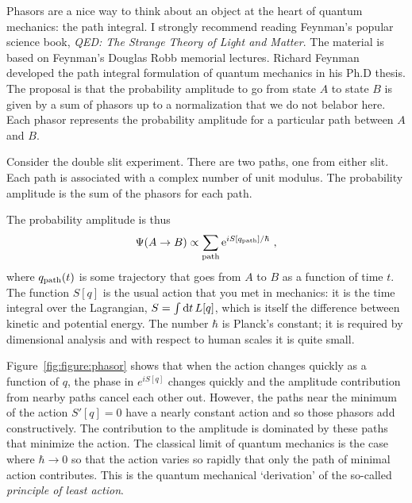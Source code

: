 \documentclass[12pt, oneside]{report}    %
\begin{document}
Phasors are a nice way to think about an object at the heart of quantum mechanics: the path integral. I strongly recommend reading Feynman's popular science book, \emph{QED: The Strange Theory of Light and Matter}\autocite{Feynman:1986er}. The material is based on Feynman's Douglas Robb memorial lectures.
% 
Richard Feynman developed the path integral formulation of quantum mechanics in his Ph.D thesis\autocite{Feynman:1942us}. The proposal is that the probability amplitude to go from state $A$ to state $B$ is given by a sum of phasors up to a normalization that we do not belabor here. Each phasor represents the probability amplitude for a particular path between $A$ and $B$. 
\begin{example}
Consider the double slit experiment. There are two paths, one from either slit. Each path is associated with a complex number of unit modulus. The probability amplitude is the sum of the phasors for each path. 
\end{example}
The probability amplitude is thus
\begin{align}
    \Psi(A\to B) \propto \sum_\textnormal{path}
    \operatorname{e}^{iS[q_\textnormal{path}]/\hbar} \ ,
\end{align}
where $q_\textnormal{path}(t)$ is some trajectory that goes from $A$ to $B$ as a function of time $t$. The function $S[q]$ is the usual action that you met in mechanics: it is the time integral over the Lagrangian, $S=\int\operatorname{d}\!{t}\, L[q]$, which is itself the difference between kinetic and potential energy. The number $\hbar$ is Planck's constant; it is required by dimensional analysis and with respect to human scales it is quite small.

Figure~\ref{fig:figure:phasor} shows that when the action changes quickly as a function of $q$, the phase in $e^{iS[q]}$ changes quickly and the amplitude contribution from nearby paths cancel each other out. However, the paths near the minimum of the action $S'[q]=0$ have a nearly constant action and so those phasors add constructively. The contribution to the amplitude is dominated by these paths that minimize the action. The classical limit of quantum mechanics is the case where $\hbar \to 0$ so that the action varies so rapidly that only the path of minimal action contributes. This is the quantum mechanical `derivation' of the so-called \emph{principle of least action}.
\end{document}
